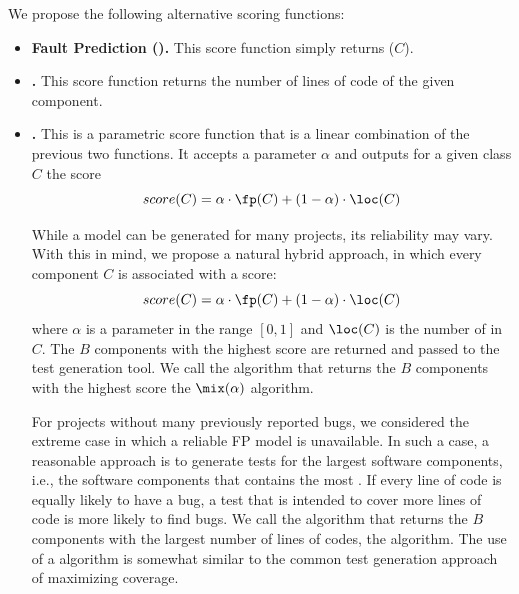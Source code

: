     
    
    
    
    
    
We propose the following alternative scoring functions: 
\begin{}


\begin{itemize}
    \item \textbf{Fault Prediction (\fp).} This score function simply returns \fp($C$).
    
    \item \textbf{\loc.} This score function returns the number of lines of code of the given component. 
    
    \item \textbf{\mix.} This is a parametric score function that is a linear combination of the previous two functions. It accepts a parameter $\alpha$ and outputs for a given class $C$ the score
    \begin{equation}
      score(C)=\alpha\cdot \fp(C)+(1-\alpha)\cdot \loc(C)
      \end{equation}
    
    While a \fp model can be generated for many projects, its reliability may vary.
    With this in mind, we propose a natural hybrid approach, in which every component
    $C$ is associated with a score:
      \begin{equation}
      score(C)=\alpha\cdot \fp(C)+(1-\alpha)\cdot \loc(C)
      \end{equation}
    where $\alpha$ is a parameter in the range $[0,1]$ and $\loc(C)$ is the
    number of \loc in $C$. The $B$ components with the highest score are
    returned and passed to the test generation tool. We call the algorithm that
    returns the $B$ components with the highest score the $\mix(\alpha)$ \btg
    algorithm.
    
    
    
    For projects without many previously reported bugs, we considered the extreme case in which a reliable FP model is unavailable. In such a case, a
    reasonable approach is to generate tests for the largest software
    components, i.e., the software components that contains the most \loc. If every line of code is equally likely to have a bug, a
    test that is intended to cover more lines of code is more likely to find
    bugs. We call the algorithm that returns the $B$ components with the largest
    number of lines of codes, the \loc \btg algorithm. The use of a \loc
    algorithm is somewhat similar to the common test generation approach of maximizing coverage.
    

\end{itemize}
\end{}
